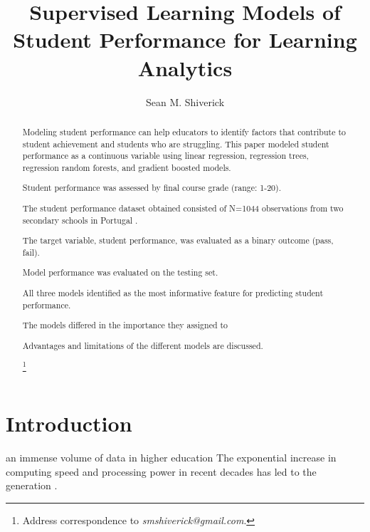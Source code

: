 \documentclass[sigconf]{acmart}
\begin{document}
  \title{Supervised Learning Models of Student Performance for Learning Analytics}
  \author{Sean M. Shiverick}
\renewcommand{\shortauthors}{S.M. Shiverick}


\begin{abstract}

Modeling student performance can help educators to identify factors that 
contribute to student achievement and students who are struggling. This 
paper modeled student performance as a continuous variable using linear 
regression, regression trees, regression random forests, and gradient 
boosted models. 

Student performance was assessed by final course grade (range: 1-20).

The student performance dataset obtained consisted of N=1044 observations from
two secondary schools in Portugal \cite{cortez08}. 

The target variable, student performance, was 
evaluated as a binary outcome (pass, fail). 

Model performance was evaluated on the testing set. 

All three models identified as the most informative feature for predicting 
student performance. 

The models differed in the importance they assigned to

Advantages and limitations of the different models are  discussed. 

\footnote{Address correspondence to \textit{smshiverick@gmail.com}.}

\end{abstract}
\maketitle

\section{Introduction}

an immense volume of data in higher education The exponential increase in 
computing speed and processing power in recent 
decades has led to the generation 
\cite{Daniel17}. 
\end{document}
